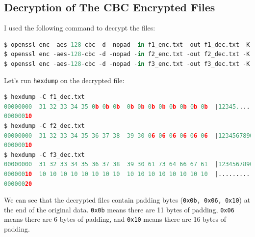 \documentclass{article}
\begin{document}
\subsection{Decryption of The CBC Encrypted Files}
I used the following command to decrypt the files:
\begin{lstlisting}[language=Python]
$ openssl enc -aes-128-cbc -d -nopad -in f1_enc.txt -out f1_dec.txt -K 00112233445566778889aabbccddeeff -iv 0102030405060708090a0b0c0d0e0f10
$ openssl enc -aes-128-cbc -d -nopad -in f2_enc.txt -out f2_dec.txt -K 00112233445566778889aabbccddeeff -iv 0102030405060708090a0b0c0d0e0f10
$ openssl enc -aes-128-cbc -d -nopad -in f3_enc.txt -out f3_dec.txt -K 00112233445566778889aabbccddeeff -iv 0102030405060708090a0b0c0d0e0f10
\end{lstlisting}
Let's run \texttt{hexdump} on the decrypted file:
\begin{lstlisting}[language=Python]
$ hexdump -C f1_dec.txt
00000000  31 32 33 34 35 0b 0b 0b  0b 0b 0b 0b 0b 0b 0b 0b  |12345...........|
00000010
$ hexdump -C f2_dec.txt
00000000  31 32 33 34 35 36 37 38  39 30 06 06 06 06 06 06  |1234567890......|
00000010
$ hexdump -C f3_dec.txt
00000000  31 32 33 34 35 36 37 38  39 30 61 73 64 66 67 61  |1234567890asdfga|
00000010  10 10 10 10 10 10 10 10  10 10 10 10 10 10 10 10  |................|
00000020
\end{lstlisting}
We can see that the decrypted files contain padding bytes (\texttt{0x0b, 0x06, 0x10}) at the end of the original data.
\texttt{0x0b} means there are 11 bytes of padding, \texttt{0x06} means there are 6 bytes of padding,
and \texttt{0x10} means there are 16 bytes of padding.
\end{document}
